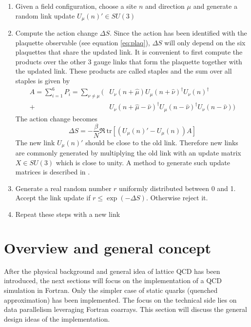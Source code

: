 \documentclass[graybox]{svmult}
\begin{document}
\begin{enumerate}
	\item Given a field configuration, choose a site $n$ and direction $\mu$ and generate a random link update $U_{\mu}(n)' \in SU(3)$
	\item Compute the action change $\Delta S$. Since the action has been identified with the plaquette observable (see equation \ref{eq:plaq}), $\Delta S$ will only depend on the six plaquettes that share the updated link. It is convenient to first compute the products over the other 3 gauge links that form the plaquette together with the updated link. These products are called staples and the sum over all staples is given by
	\begin{align}
		A = \sum_{i=1}^6 P_i = \sum_{\nu \neq \mu} \big( &U_{\nu}(n+\hat{\mu}) U_{\mu}(n+\hat{\nu})^{\dagger} U_{\nu}(n)^{\dagger}\\
		+ &U_{\nu}(n+\hat{\mu}-\hat{\nu})^{\dagger} U_{\mu}(n-\hat{\nu})^{\dagger} U_{\nu}(n-\hat{\nu}) \big)
	\end{align}
	The action change becomes
	\begin{equation}
		\Delta S = -\frac{\beta}{N} \Re\ \text{tr} [ (U_{\mu}(n)' - U_{\mu}(n)) A]
	\end{equation}
	The new link $U_{\mu}(n)'$ should be close to the old link. Therefore new links are commonly generated by multiplying the old link with an update matrix $X \in SU(3)$ which is close to unity. A method to generate such update matrices is described in \cite{gattringer}.
	\item Generate a real random number $r$ uniformly distributed between 0 and 1. Accept the link update if $r \leq \exp(-\Delta S)$. Otherwise reject it.
	\item Repeat these steps with a new link
\end{enumerate}




\section{Overview and general concept}

After the physical background and general idea of lattice QCD has been introduced, the next sections will focus on the implementation of a QCD simulation in Fortran. Only the simpler case of static quarks (quenched approximation) has been implemented. The focus on the technical side lies on data parallelism leveraging Fortran coarrays. This section will discuss the general design ideas of the implementation.
\end{document}
